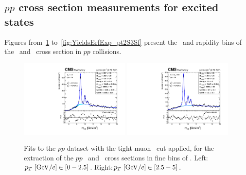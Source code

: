 \subsection{$pp$ cross section measurements for excited states}

Figures from~\ref{fig:YieldsErfExp_2S3Sa} to~\ref{fig:YieldsErfExp_pt2S3Sf}
present the \pt\ and rapidity bins of the \PgUb\ and \PgUc\ cross
section in $pp$ collisions.

\begin{figure}
  \includegraphics[width=0.49\textwidth]{Chapters/aYield/pp/pt_4_4/Pt/Pt_0_2p5/pp2p76tev_Pt_0_2p5_fsr1.pdf}  
  \includegraphics[width=0.49\textwidth]{Chapters/aYield/pp/pt_4_4/Pt/Pt_2p5_5/pp2p76tev_Pt_2p5_5_fsr1.pdf}  
  \caption{Fits to the $pp$ dataset with the tight muon \pt\ cut
    applied, for the extraction of the $pp$ \PgUb\ and \PgUc\ cross
    sections in fine bins of \pt. Left:$p_{T}~[{\rm GeV}/c]\in [0 - 2.5]$. Right:$p_{T}~[{\rm GeV}/c]\in [2.5 - 5]$.}
  \label{fig:YieldsErfExp_2S3Sa} 
\end{figure}
